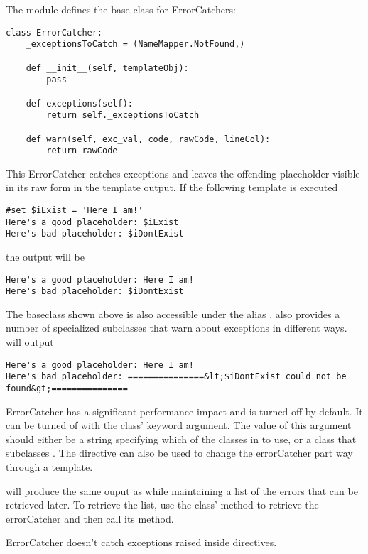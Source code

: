 The  module defines the base class for
ErrorCatchers:

\begin{verbatim}
class ErrorCatcher:
    _exceptionsToCatch = (NameMapper.NotFound,)
    
    def __init__(self, templateObj):
        pass
    
    def exceptions(self):
        return self._exceptionsToCatch
    
    def warn(self, exc_val, code, rawCode, lineCol):
        return rawCode
\end{verbatim}    

This ErrorCatcher catches  exceptions and leaves the
offending placeholder visible in its raw form in the template output.  If the
following template is executed 
\begin{verbatim}
#set $iExist = 'Here I am!'
Here's a good placeholder: $iExist
Here's bad placeholder: $iDontExist
\end{verbatim}    

the output will be 

\begin{verbatim}
Here's a good placeholder: Here I am!
Here's bad placeholder: $iDontExist
\end{verbatim}

The baseclass shown above is also accessible under the alias
.   also provides a
number of specialized subclasses that warn about exceptions in different ways.
 will output

\begin{verbatim}
Here's a good placeholder: Here I am!
Here's bad placeholder: ===============&lt;$iDontExist could not be found&gt;===============
\end{verbatim}

ErrorCatcher has a significant performance impact and is turned off by default.
It can be turned of with the  class' 
keyword argument.  The value of this argument should either be a string
specifying which of the classes in  to use, or a
class that subclasses . The
 directive can also be used to change the errorCatcher part
way through a template.


 will produce the same ouput as
 while maintaining a list of the errors that can be retrieved later.
To retrieve the list, use the  class'  method
to retrieve the errorCatcher and then call its  method.


ErrorCatcher doesn't catch exceptions raised inside directives. 





